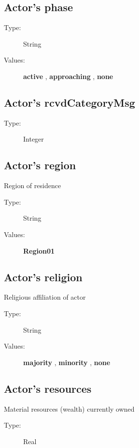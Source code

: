 \documentclass{article}%
\begin{document}
%
\subsection{Actor's phase}%
\label{subsec:Actor's phase}%
\begin{description}%
\item[Type:]%
String%
\item[Values:]%
\textbf{active}%
, %
\textbf{approaching}%
, %
\textbf{none}%
\end{description}

%
\subsection{Actor's rcvdCategoryMsg}%
\label{subsec:Actor's rcvdCategoryMsg}%
\begin{description}%
\item[Type:]%
Integer%
\end{description}

%
\subsection{Actor's region}%
\label{subsec:Actor's region}%
Region of residence%
\begin{description}%
\item[Type:]%
String%
\item[Values:]%
\textbf{Region01}%
\end{description}

%
\subsection{Actor's religion}%
\label{subsec:Actor's religion}%
Religious affiliation of actor%
\begin{description}%
\item[Type:]%
String%
\item[Values:]%
\textbf{majority}%
, %
\textbf{minority}%
, %
\textbf{none}%
\end{description}

%
\subsection{Actor's resources}%
\label{subsec:Actor's resources}%
Material resources (wealth) currently owned%
\begin{description}%
\item[Type:]%
Real%
\end{description}%
\end{document}
